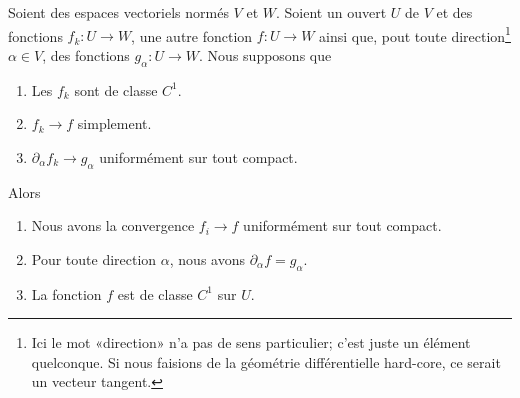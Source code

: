 \begin{theorem}	\label{ThoSerUnifDerr}
	Soient des espaces vectoriels normés \( V\) et \( W\). Soient un ouvert \( U\) de \( V\) et des fonctions \( f_k\colon U\to W\), une autre fonction \( f\colon U\to W\) ainsi que, pout toute direction\footnote{Ici le mot «direction» n'a pas de sens particulier; c'est juste un élément quelconque. Si nous faisions de la géométrie différentielle hard-core, ce serait un vecteur tangent.} \( \alpha\in V\), des fonctions \( g_{\alpha}\colon U\to W\). Nous supposons que
	\begin{enumerate}
		\item
		      Les \( f_k\) sont de classe \( C^1\).
		\item
		      \( f_k\to f\) simplement.
		\item
		      \( \partial_{\alpha}f_k\to g_{\alpha}\) uniformément sur tout compact.
	\end{enumerate}
	Alors
	\begin{enumerate}
		\item       \label{ITEMooQOSUooQGSUXC}
		      Nous avons la convergence \( f_i\to f\) uniformément sur tout compact.
		\item        \label{ITEMooGFPLooGYEvkh}
		      Pour toute direction \( \alpha\), nous avons \( \partial_{\alpha}f=g_{\alpha}\).
		\item
		      La fonction \( f\) est de classe \( C^1\) sur \( U\).
	\end{enumerate}
\end{theorem}

